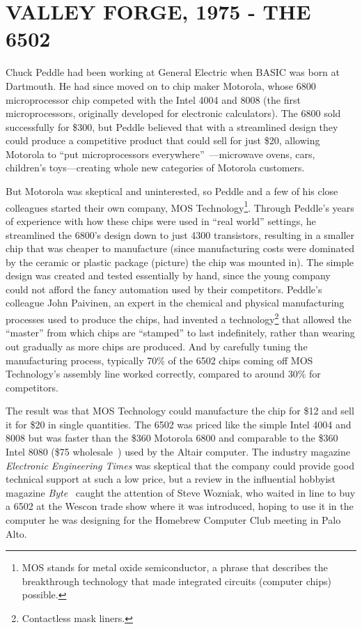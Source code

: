
\section{VALLEY FORGE, 1975 - THE 6502}

Chuck Peddle had been working at General Electric when BASIC was
born at Dartmouth.  He had since moved on to chip maker Motorola, whose 6800
microprocessor chip competed with the Intel 4004 and
8008 (the first microprocessors, originally developed for
electronic calculators).  The 6800 sold successfully for \$300, but
Peddle  believed that with a streamlined design they could
produce a competitive product that could sell for just \$20,
allowing Motorola to ``put
microprocessors everywhere''~\cite[p. 31]{commodore}---microwave ovens,
cars, children's toys---creating whole new categories of Motorola customers.

But Motorola was skeptical and uninterested, so Peddle and a few of his close
colleagues started their own company, MOS Technology\footnote{MOS stands
  for metal oxide 
semiconductor, a phrase that describes the breakthrough technology that
made integrated circuits (computer chips) possible.}.
Through Peddle's years
of experience with how these chips were used in ``real world'' settings,
he streamlined the 6800's design 
down to just 4300 transistors, resulting in a smaller chip that was
cheaper to manufacture (since manufacturing costs were dominated by the
ceramic or plastic 
package (picture) the chip was mounted in).
The simple design was created and tested essentially by hand,
since the young company could not afford the
fancy automation used by their competitors.
Peddle's colleague John Paivinen, an expert in the chemical
and physical manufacturing processes used to produce the chips, had
invented a technology\footnote{Contactless mask liners.} that allowed
the ``master'' from which chips are ``stamped'' to last indefinitely,
rather than wearing out gradually as more chips are produced.
And by carefully tuning the manufacturing process,
typically 70\% of the 6502 chips coming off MOS Technology's assembly
line worked correctly, compared to around 30\% for competitors.

The result was that MOS Technology could manufacture the chip for \$12
and sell it for \$20 in single quantities.  The 6502 was priced like
the simple Intel 4004 and 8008 but was faster than the \$360 Motorola
6800 and comparable to the
\$360 Intel 8080 (\$75
wholesale~\cite[p. 228]{ceruzzi})  used by the Altair computer.
The industry magazine \emph{Electronic
  Engineering Times} was skeptical that the company could provide good
technical support at such a low price, but a review in the influential
hobbyist magazine \emph{Byte}~\cite{byte75:6502} caught the attention of
Steve Wozniak, who waited in line  to buy
a 6502 at the Wescon trade show where it was introduced,
hoping to use it in the computer he was
designing for the Homebrew Computer Club meeting in Palo Alto.  

